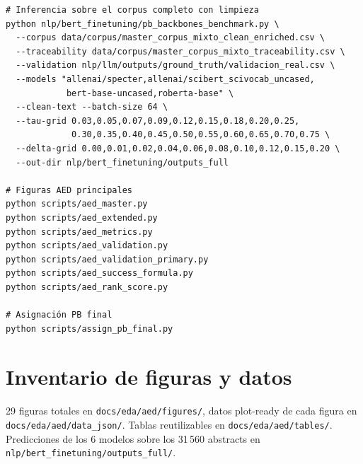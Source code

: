 \documentclass[11pt,a4paper]{article}
\begin{document}
\begin{verbatim}
# Inferencia sobre el corpus completo con limpieza
python nlp/bert_finetuning/pb_backbones_benchmark.py \
  --corpus data/corpus/master_corpus_mixto_clean_enriched.csv \
  --traceability data/corpus/master_corpus_mixto_traceability.csv \
  --validation nlp/llm/outputs/ground_truth/validacion_real.csv \
  --models "allenai/specter,allenai/scibert_scivocab_uncased,
            bert-base-uncased,roberta-base" \
  --clean-text --batch-size 64 \
  --tau-grid 0.03,0.05,0.07,0.09,0.12,0.15,0.18,0.20,0.25,
             0.30,0.35,0.40,0.45,0.50,0.55,0.60,0.65,0.70,0.75 \
  --delta-grid 0.00,0.01,0.02,0.04,0.06,0.08,0.10,0.12,0.15,0.20 \
  --out-dir nlp/bert_finetuning/outputs_full

# Figuras AED principales
python scripts/aed_master.py
python scripts/aed_extended.py
python scripts/aed_metrics.py
python scripts/aed_validation.py
python scripts/aed_validation_primary.py
python scripts/aed_success_formula.py
python scripts/aed_rank_score.py

# Asignación PB final
python scripts/assign_pb_final.py
\end{verbatim}

\section{Inventario de figuras y datos}

29 figuras totales en \texttt{docs/eda/aed/figures/}, datos plot-ready de cada figura en \texttt{docs/eda/aed/data\_json/}. Tablas reutilizables en \texttt{docs/eda/aed/tables/}. Predicciones de los 6 modelos sobre los 31\,560 abstracts en \texttt{nlp/bert\_finetuning/outputs\_full/}.
\end{document}
